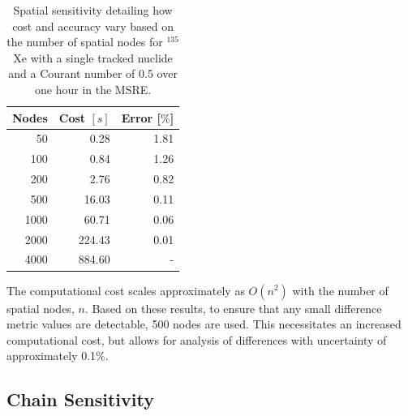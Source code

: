 \documentclass{style/nseJournal}
\begin{document}
\begin{table}[!ht]
    \centering
    \caption{Spatial sensitivity detailing how cost and accuracy vary based on the number of spatial nodes for $^{135}$Xe with a single tracked nuclide and a Courant number of 0.5 over one hour in the MSRE.}
    \begin{tabular}{r r r}
       \hline
       Nodes  & Cost $[s]$ & Error [$\%$]\\
       \hline
    50 & 0.28 & 1.81 \\
    100 & 0.84 & 1.26 \\
    200 & 2.76 & 0.82 \\
    500 & 16.03 & 0.11 \\
    1000 & 60.71 & 0.06 \\
    2000 & 224.43 & 0.01 \\
    4000 & 884.60 & - \\
        \hline
    \end{tabular}
    \label{tab:spat-ref}
\end{table}


The computational cost scales approximately as $O(n^2)$ with the number of spatial nodes, $n$.
Based on these results, to ensure that any small difference metric values are detectable, 500 nodes are used.
This necessitates an increased computational cost, but allows for analysis of differences with uncertainty of approximately 0.1\%.

\subsection{Chain Sensitivity}
\end{document}
